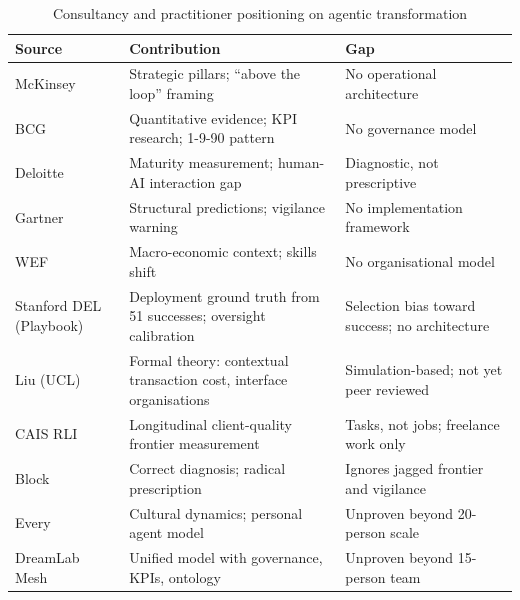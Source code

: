 \begin{table}[h]
\centering
\caption{Consultancy and practitioner positioning on agentic transformation}
\label{tab:landscape-comparison}
\begin{tabularx}{\textwidth}{l X X}
\toprule
\textbf{Source} & \textbf{Contribution} & \textbf{Gap} \\
\midrule
McKinsey & Strategic pillars; ``above the loop'' framing & No operational architecture \\
\addlinespace
BCG & Quantitative evidence; KPI research; 1-9-90 pattern & No governance model \\
\addlinespace
Deloitte & Maturity measurement; human-AI interaction gap & Diagnostic, not prescriptive \\
\addlinespace
Gartner & Structural predictions; vigilance warning & No implementation framework \\
\addlinespace
WEF & Macro-economic context; skills shift & No organisational model \\
\addlinespace
Stanford DEL (Playbook) & Deployment ground truth from 51 successes; oversight calibration & Selection bias toward success; no architecture \\
\addlinespace
Liu (UCL) & Formal theory: contextual transaction cost, interface organisations & Simulation-based; not yet peer reviewed \\
\addlinespace
CAIS RLI & Longitudinal client-quality frontier measurement & Tasks, not jobs; freelance work only \\
\addlinespace
Block & Correct diagnosis; radical prescription & Ignores jagged frontier and vigilance \\
\addlinespace
Every & Cultural dynamics; personal agent model & Unproven beyond 20-person scale \\
\addlinespace
DreamLab Mesh & Unified model with governance, KPIs, ontology & Unproven beyond 15-person team \\
\bottomrule
\end{tabularx}
\end{table}

